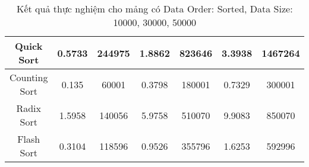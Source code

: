 \begin{table}[H]
{\begin{tabular}{|ccccccc|}
\multicolumn{1}{|c|}{Quick Sort} & \multicolumn{1}{c|}{0.5733} & \multicolumn{1}{c|}{244975} & \multicolumn{1}{c|}{1.8862} & \multicolumn{1}{c|}{823646} & \multicolumn{1}{c|}{3.3938} & \multicolumn{1}{c|}{1467264} \\ \hline
\multicolumn{1}{|c|}{Counting Sort} & \multicolumn{1}{c|}{0.135} & \multicolumn{1}{c|}{60001} & \multicolumn{1}{c|}{0.3798} & \multicolumn{1}{c|}{180001} & \multicolumn{1}{c|}{0.7329} & \multicolumn{1}{c|}{300001} \\ \hline
\multicolumn{1}{|c|}{Radix Sort} & \multicolumn{1}{c|}{1.5958} & \multicolumn{1}{c|}{140056} & \multicolumn{1}{c|}{5.9758} & \multicolumn{1}{c|}{510070} & \multicolumn{1}{c|}{9.9083} & \multicolumn{1}{c|}{850070} \\ \hline
\multicolumn{1}{|c|}{Flash Sort} & \multicolumn{1}{c|}{0.3104} & \multicolumn{1}{c|}{118596} & \multicolumn{1}{c|}{0.9526} & \multicolumn{1}{c|}{355796} & \multicolumn{1}{c|}{1.6253} & \multicolumn{1}{c|}{592996} \\ \hline
\end{tabular}%
}
\caption{Kết quả thực nghiệm cho mảng có Data Order: Sorted, Data Size: 10000, 30000, 50000}
\label{tab:sorted_10000_30000_50000}
\end{table}


